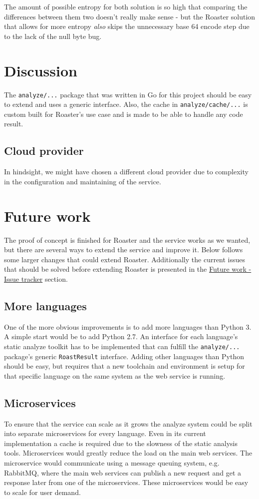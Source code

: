 \documentclass[12pt,a4paper]{report}
\begin{document}
The amount of possible entropy for both solution is so high that comparing the differences
between them two doesn't really make sense - but the Roaster solution that allows for more entropy
\textit{also} skips the unnecessary base 64 encode step due to the lack of the null byte bug.

\chapter{Discussion}
The \texttt{analyze/...} package that was written in Go for this project should be easy to extend and uses a generic interface. Also, the cache in \texttt{analyze/cache/...} is custom built for Roaster's use case and is made to be able to handle any code result.

\section{Cloud provider}
In hindsight, we might have chosen a different cloud provider due to complexity in the configuration and maintaining of the service. 

\chapter{Future work}
\label{sec:future-work}
The proof of concept is finished for Roaster and the service works as we wanted, but there are several ways to extend the service and improve it. Below follows some larger changes that could extend Roaster. Additionally the current issues that should be solved before extending Roaster is presented in the \hyperref[sec:issue-tracker]{Future work - Issue tracker} section.

\section{More languages}
One of the more obvious improvements is to add more languages than Python 3. A simple start would be to add Python 2.7. An interface for each language's static analyze toolkit has to be implemented that can fulfill the \texttt{analyze/...} package's generic \texttt{RoastResult} interface. Adding other languages than Python should be easy, but requires that a new toolchain and environment is setup for that specific language on the same system as the web service is running.

\section{Microservices}
To ensure that the service can scale as it grows the analyze system could be split into separate microservices for every language. Even in its current implementation a cache is required due to the slowness of the static analysis tools. Microservices would greatly reduce the load on the main web services. The microservice would communicate using a message queuing system, e.g. RabbitMQ, where the main web services can publish a new request and get a response later from one of the microservices. These microservices would be easy to scale for user demand.
\end{document}

